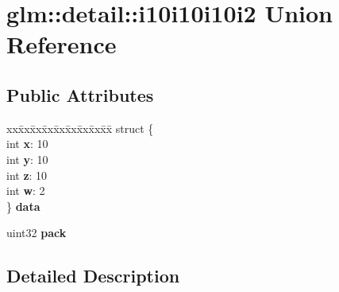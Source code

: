 \hypertarget{unionglm_1_1detail_1_1i10i10i10i2}{}\section{glm\+:\+:detail\+:\+:i10i10i10i2 Union Reference}
\label{unionglm_1_1detail_1_1i10i10i10i2}
\subsection*{Public Attributes}
\begin{DoxyCompactItemize}
\item 
\mbox{\label{unionglm_1_1detail_1_1i10i10i10i2_ab4c1d4602d19f6bdfdf850ff892cd0c7}} 
\begin{tabbing}
xx\=xx\=xx\=xx\=xx\=xx\=xx\=xx\=xx\=\kill
struct \{\\
\mbox{\label{unionglm_1_1detail_1_1i10i10i10i2_a996337c75db813c21d945a11d66bfa37}} 
int {\bfseries x}: 10\\
\mbox{\label{unionglm_1_1detail_1_1i10i10i10i2_a6ee621f4b64f6d416b0fdb631f9dc362}} 
int {\bfseries y}: 10\\
\mbox{\label{unionglm_1_1detail_1_1i10i10i10i2_a75825ee93b215cc4bed5a06d470b4ba0}} 
int {\bfseries z}: 10\\
\mbox{\label{unionglm_1_1detail_1_1i10i10i10i2_a5154ea2ef29cd68540b2cc928ed2cb63}} 
int {\bfseries w}: 2\\
\} {\bfseries data}\\

\end{tabbing}\item 
\mbox{\label{unionglm_1_1detail_1_1i10i10i10i2_a24e2dc324c86589d568dc330904c859a}} 
uint32 {\bfseries pack}
\end{DoxyCompactItemize}


\subsection{Detailed Description}


